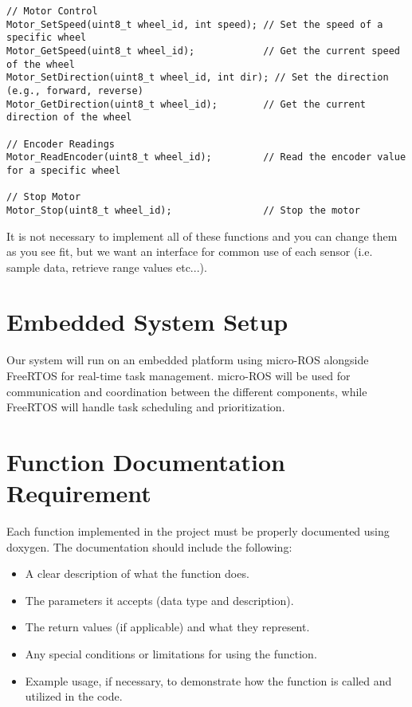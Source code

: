 \documentclass[a4paper,9pt]{article}
\begin{document}
\begin{enumerate}
\begin{itemize}
\begin{lstlisting}
// Motor Control
Motor_SetSpeed(uint8_t wheel_id, int speed); // Set the speed of a specific wheel
Motor_GetSpeed(uint8_t wheel_id);            // Get the current speed of the wheel
Motor_SetDirection(uint8_t wheel_id, int dir); // Set the direction (e.g., forward, reverse)
Motor_GetDirection(uint8_t wheel_id);        // Get the current direction of the wheel

// Encoder Readings
Motor_ReadEncoder(uint8_t wheel_id);         // Read the encoder value for a specific wheel

// Stop Motor
Motor_Stop(uint8_t wheel_id);                // Stop the motor
		            \end{lstlisting}
	      \end{itemize}
\end{enumerate}


It is not necessary to implement all of these functions and you can change them as you see fit, but we want an interface for common use of each sensor (i.e. sample data, retrieve range values etc...).

\section*{Embedded System Setup}
Our system will run on an embedded platform using micro-ROS alongside FreeRTOS for real-time task management. micro-ROS will be used for communication and coordination between the different components, while FreeRTOS will handle task scheduling and prioritization. 

\section*{Function Documentation Requirement}
Each function implemented in the project must be properly documented using doxygen. The documentation should include the following:
\begin{itemize}
    \item A clear description of what the function does.
    \item The parameters it accepts (data type and description).
    \item The return values (if applicable) and what they represent.
    \item Any special conditions or limitations for using the function.
    \item Example usage, if necessary, to demonstrate how the function is called and utilized in the code.
\end{itemize}
\end{document}
